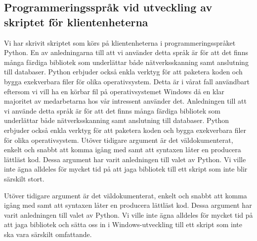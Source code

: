 \documentclass[swedish, a4paper,12pt]{article}
\begin{document}
\subsection{Programmeringsspråk vid utveckling av skriptet för klientenheterna}
Vi har skrivit skriptet som körs på klientenheterna i programmeringsspråket Python.
En av anledningarna till att vi använder detta språk är för att det finns många färdiga bibliotek som underlättar både nätverksskanning samt anslutning till databaser. Python erbjuder också enkla verktyg för att paketera koden och bygga exekverbara filer för olika operativsystem. Detta är i vårat fall användbart eftersom vi vill ha en körbar fil på operativsystemet Windows då en klar majoritet av medarbetarna hos vår intressent använder det.	Anledningen till att vi använde detta språk är för att det finns många färdiga bibliotek som underlättar både nätverksskanning samt anslutning till databaser. Python erbjuder också enkla verktyg för att paketera koden och bygga exekverbara filer för olika operativsystem. Utöver tidigare argument är det väldokumenterat, enkelt och snabbt att komma igång med samt att syntaxen låter en producera lättläst kod. Dessa argument har varit anledningen till valet av Python. Vi ville inte ägna alldeles för mycket tid på att jaga bibliotek till ett skript som inte blir särskilt stort.

Utöver tidigare argument är det väldokumenterat, enkelt och snabbt att komma igång med samt att syntaxen låter en producera lättläst kod. Dessa argument har varit anledningen till valet av Python. Vi ville inte ägna alldeles för mycket tid på att jaga bibliotek och sätta oss in i Windows-utveckling till ett skript som inte ska vara särskilt omfattande.
\end{document}

